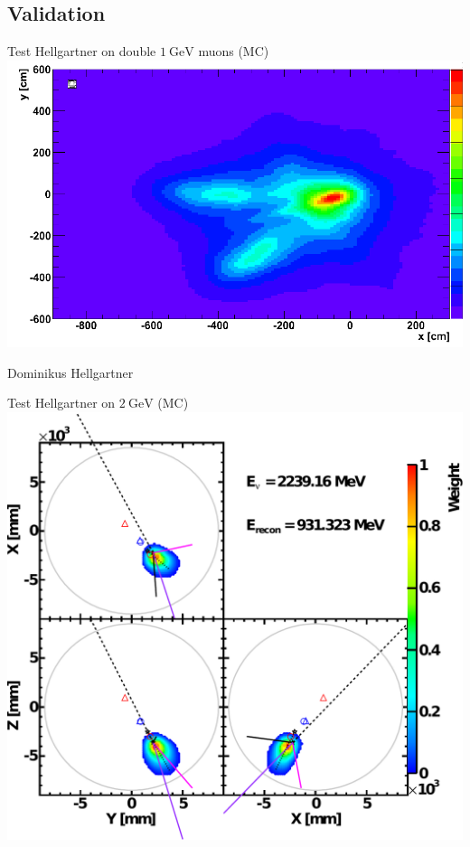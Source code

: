 \documentclass[14pt]{beamer}
\begin{document}
\subsection{Validation}
\begin{frame}{\normalsize Test Hellgartner on double
	$\SI{1}{\giga\electronvolt}$ muons (MC)}
	\includegraphics[width=\linewidth]{hellgartner_double_muon.pdf}

	{\footnotesize Dominikus Hellgartner}
\end{frame}

\begin{frame}{Test Hellgartner on
	$\SI{2}{\giga\electronvolt}$ \Pnue (MC)}
	\centering
	\includegraphics[width=0.8\linewidth]{hellgartner_reconstruction_2gev_nue_klg4sim.pdf}
\end{frame}
\end{document}
